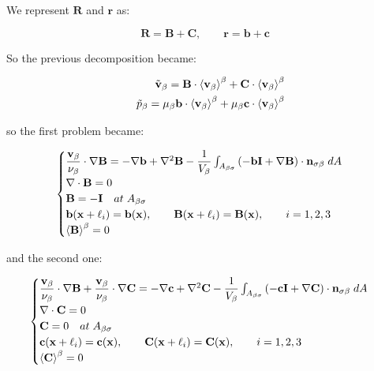 We represent $\mathbf{R}$ and $\mathbf{r}$ as:

$$
 \mathbf{R} = \mathbf{B} + \mathbf{C}, \qquad \mathbf{r} = \mathbf{b} + \mathbf{c}
$$

So the previous decomposition became:

\begin{eqnarray}
	&& \tilde{\textbf{v}}_{\beta} = \mathbf{B} \cdot {\left< \textbf{v}_{\beta}\right>}^{\beta} + \mathbf{C} \cdot {\left< \textbf{v}_{\beta}\right>}^{\beta}  \\
	&& \tilde{p}_{\beta} = \mu_{\beta} \mathbf{b} \cdot {\left< \textbf{v}_{\beta}\right>}^{\beta} + \mu_{\beta} \mathbf{c} \cdot {\left< \textbf{v}_{\beta}\right>}^{\beta} 
\end{eqnarray}

so the first problem became:

\begin{eqnarray}
	\begin{cases}
		\dfrac{\textbf{v}_{\beta}}{\nu_{\beta}} \cdot  \nabla \mathbf{B} = -\nabla \mathbf{b} + \nabla^2 \mathbf{B} - \dfrac{1}{V_\beta} \int_{A_{\beta \sigma}}  \left(-\mathbf{b}\mathbf{I}  +  \nabla \mathbf{B} \right) \cdot \mathbf{n}_{\sigma \beta} \;dA  \\
		\nabla \cdot \mathbf{B} = 0  \\
		\mathbf{B} = -\mathbf{I} \quad at \; A_{\beta \sigma} \\
		\mathbf{b}(\mathbf{x} +\ell_i) = \mathbf{b}(\mathbf{x}), \qquad \mathbf{B}(\mathbf{x} +\ell_i) = \mathbf{B}(\mathbf{x}), \qquad i=1,2,3 \\
		{\left< \mathbf{B} \right>}^{\beta} = 0
	\end{cases}
\label{eq:B_problem}
\end{eqnarray}

and the second one:

\begin{eqnarray}
	\begin{cases}
		\dfrac{\textbf{v}_{\beta}}{\nu_{\beta}} \cdot  \nabla \mathbf{B} +\dfrac{\textbf{v}_{\beta}}{\nu_{\beta}} \cdot  \nabla \mathbf{C} = -\nabla \mathbf{c} +  \nabla^2 \mathbf{C} - \dfrac{1}{V_\beta} \int_{A_{\beta \sigma}}  \left(-\mathbf{c}\mathbf{I}  +  \nabla \mathbf{C} \right) \cdot \mathbf{n}_{\sigma \beta} \;dA  \\
		\nabla \cdot \mathbf{C} = 0  \\
		\mathbf{C} = 0 \quad at \; A_{\beta \sigma} \\
		\mathbf{c}(\mathbf{x} +\ell_i) = \mathbf{c}(\mathbf{x}), \qquad \mathbf{C}(\mathbf{x} +\ell_i) = \mathbf{C}(\mathbf{x}), \qquad i=1,2,3 \\
		{\left< \mathbf{C} \right>}^{\beta} = 0
	\end{cases}
\label{eq:C_problem}
\end{eqnarray}

